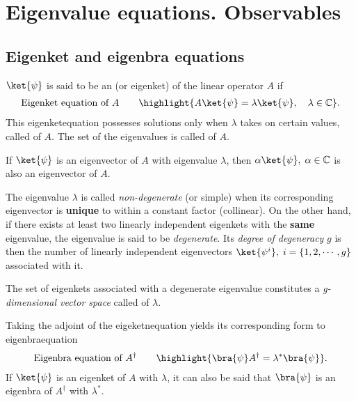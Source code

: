 \section{Eigenvalue equations. Observables}

\subsection{Eigenket and eigenbra equations}

$\ket{\psi}$ is said to be an  (or eigenket) of the linear operator $A$ if
\begin{align}
    \text{Eigenket equation of $A$}\qquad\highlight{A\ket{\psi}=\lambda\ket{\psi},\quad\lambda\in\mathbb{C}}.
    \label{eq:eigenketequation}
\end{align}
This eigenketequation possesses solutions only when $\lambda$ takes on certain values, called  of $A$.
The set of the eigenvalues is called  of $A$.
\begin{emphasizer}
    If $\ket{\psi}$ is an eigenvector of $A$ with eigenvalue $\lambda$, then $\alpha\ket{\psi},\;\alpha\in\mathbb{C}$ is also an eigenvector of $A$.
\end{emphasizer}

The eigenvalue $\lambda$ is called \emph{non-degenerate} (or simple) when its corresponding eigenvector is \textbf{unique} to within a constant factor (collinear).
On the other hand, if there exists at least two linearly independent eigenkets with the \textbf{same} eigenvalue, the eigenvalue is said to be \emph{degenerate}.
Its \emph{degree of degeneracy} $g$ is then the number of linearly independent eigenvectors $\ket{\psi^i},\;i=\{1,2,\cdots,g\}$ associated with it.

The set of eigenkets associated with a degenerate eigenvalue constitutes a \emph{g-dimensional vector space} called  of $\lambda$.

Taking the adjoint of the eigeketnequation yields its corresponding form to eigenbraequation
\begin{align}
    \text{Eigenbra equation of $A^\dagger$}\qquad\highlight{\bra{\psi}A^\dagger=\lambda^*\bra{\psi}}.
    \label{eq:eigenbraequation}
\end{align}
If $\ket{\psi}$ is an eigenket of $A$ with $\lambda$, it can also be said that $\bra{\psi}$ is an eigenbra of $A^\dagger$ with $\lambda^*$.
